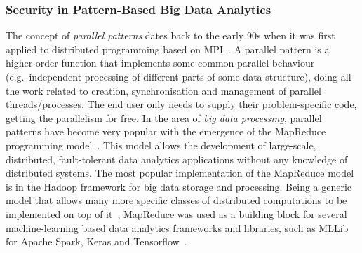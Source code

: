 \documentclass[a4paper,11pt]{article}
\begin{document}
\subsubsection{Security in Pattern-Based Big Data Analytics}
\label{sect:patterns}

The concept of \emph{parallel patterns} dates back to the early 90s when it was first applied to distributed programming based on MPI~\cite{cole89skeletons}. A parallel pattern is a higher-order function that implements some common parallel behaviour (e.g.~independent processing of different parts of some data structure), doing all the work related to creation, synchronisation and management of parallel threads/processes. The end user only needs to supply their problem-specific code, getting the parallelism for free. 
In the area of \emph{big data processing}, parallel patterns have become very popular with the emergence of the MapReduce programming model~\cite{mapreduce}. This model allows the development of large-scale, distributed, fault-tolerant data analytics applications without any knowledge of distributed systems. The most popular implementation of the MapReduce model is in the Hadoop framework for big data storage and processing. Being a generic model that allows many more specific classes of distributed computations to be implemented on top of it~\cite{bigdatabook}, MapReduce was used as a building block for several machine-learning based data analytics frameworks and libraries, such as MLLib~\cite{mllib} for Apache Spark, Keras and Tensorflow~\cite{tensorflow}.
%
\end{document}
